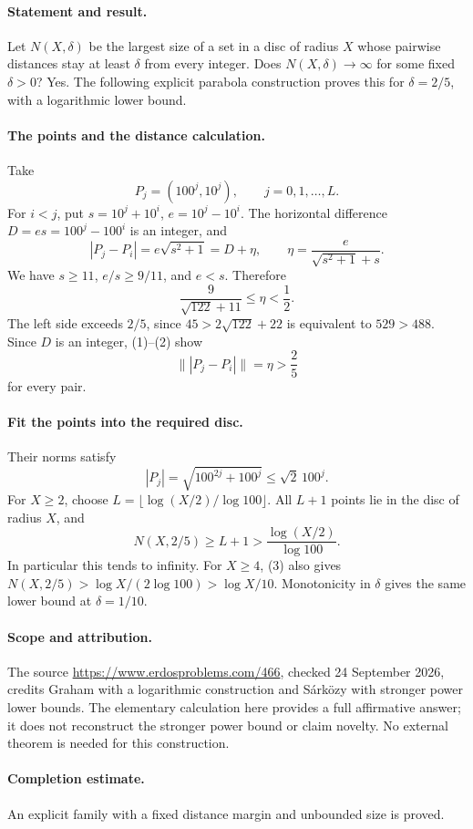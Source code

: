 \paragraph{Statement and result.}
Let \(N(X,\delta)\) be the largest size of a set in a disc of radius
\(X\) whose pairwise distances stay at least \(\delta\) from every
integer. Does \(N(X,\delta)\to\infty\) for some fixed \(\delta>0\)?
Yes. The following explicit parabola construction proves this for
\(\delta=2/5\), with a logarithmic lower bound.

\paragraph{The points and the distance calculation.}
Take
\[
 P_j=(100^j,10^j),\qquad j=0,1,\ldots,L.
\]
For \(i<j\), put \(s=10^j+10^i\), \(e=10^j-10^i\).
The horizontal difference \(D=es=100^j-100^i\) is an integer, and
\[
 |P_j-P_i|=e\sqrt{s^2+1}=D+\eta,\qquad
 \eta=\frac{e}{\sqrt{s^2+1}+s}.
 \tag{1}
\]
We have \(s\geq11\), \(e/s\geq9/11\), and \(e<s\). Therefore
\[
 \frac{9}{\sqrt{122}+11}
 \leq\eta<\frac12.
 \tag{2}
\]
The left side exceeds \(2/5\), since
\(45>2\sqrt{122}+22\) is equivalent to \(529>488\).
Since \(D\) is an integer, (1)--(2) show
\[
 \bigl\||P_j-P_i|\bigr\|=\eta>\frac25
\]
for every pair.

\paragraph{Fit the points into the required disc.}
Their norms satisfy
\[
 |P_j|=\sqrt{100^{2j}+100^j}\leq\sqrt2\,100^j.
\]
For \(X\geq2\), choose
\(L=\lfloor\log(X/2)/\log100\rfloor\).
All \(L+1\) points lie in the disc of radius \(X\), and
\[
 N(X,2/5)\geq L+1>
 \frac{\log(X/2)}{\log100}.
 \tag{3}
\]
In particular this tends to infinity. For \(X\geq4\), (3) also gives
\(N(X,2/5)>\log X/(2\log100)>\log X/10\).
Monotonicity in \(\delta\) gives the same lower bound at \(\delta=1/10\).

\paragraph{Scope and attribution.}
The source \url{https://www.erdosproblems.com/466},
checked 24 September 2026, credits Graham with a logarithmic construction
and S\'ark\"ozy with stronger power lower bounds.
The elementary calculation here provides a full affirmative answer;
it does not reconstruct the stronger power bound or claim novelty.
No external theorem is needed for this construction.

\paragraph{Completion estimate.}
An explicit family with a fixed distance margin and unbounded size is proved.
